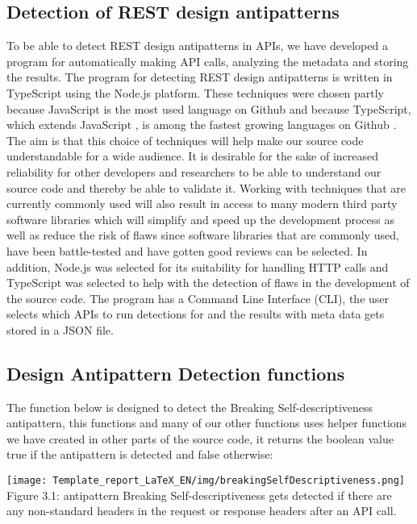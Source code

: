 \documentclass[a4paper,12pt]{article}
\begin{document}
\subsection{Detection of REST design antipatterns}

To be able to detect REST design antipatterns in APIs, we have developed a program for automatically making API calls, analyzing the metadata and storing the results. 
The program for detecting REST design antipatterns is written in TypeScript using the Node.js platform. These techniques were chosen partly because JavaScript is the most used language on Github \cite{octogithub} and because TypeScript, which extends JavaScript \cite{typescript}, is among the fastest growing languages on Github \cite{octogithub}. The aim is that this choice of techniques will help make our source code understandable for a wide audience. It is desirable for the sake of increased reliability for other developers and researchers to be able to understand our source code and thereby be able to validate it. Working with techniques that are currently commonly used will also result in access to many modern third party software libraries which will simplify and speed up the development process as well as reduce the risk of flaws since software libraries that are commonly used, have been battle-tested and have gotten good reviews can be selected. In addition, Node.js was selected for its suitability for handling HTTP calls \cite{nodejs} and TypeScript was selected to help with the detection of flaws \cite{typescript} in the development of the source code. 
The program has a Command Line Interface (CLI), the user selects which APIs to run detections for and the results with meta data gets stored in a JSON file. 

\subsection{Design Antipattern Detection functions}

The function below is designed to detect the Breaking Self-descriptiveness antipattern, this functions and many of our other functions uses helper functions we have created in other parts of the source code, it returns the boolean value true if the antipattern is detected and false otherwise:

\begin{center}
\texttt{[image: Template\_report\_LaTeX\_EN/img/breakingSelfDescriptiveness.png]}
Figure 3.1: antipattern Breaking Self-descriptiveness gets detected if there are any non-standard headers in the request or response headers after an API call. 
\end{center}
\end{document}
